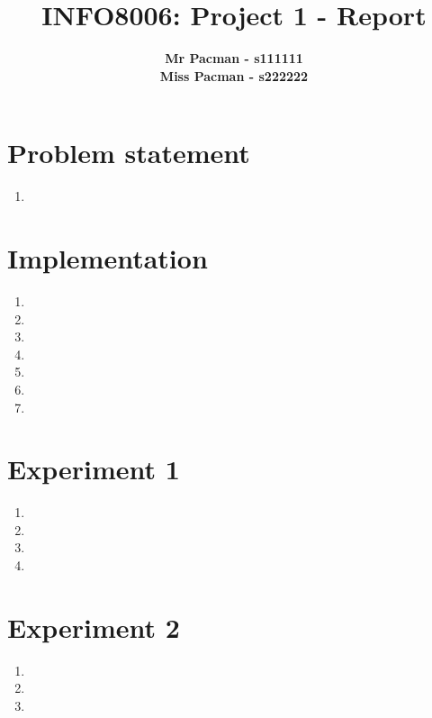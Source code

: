 \documentclass{article}
\begin{document}

\title{\Large{INFO8006: Project 1 - Report}}
\vspace{1cm}
\author{\small{\bf Mr Pacman - s111111} \\ \small{\bf Miss Pacman - s222222}}

\maketitle


\section{Problem statement}

\begin{enumerate}[label=\alph*.]
    \item 
\end{enumerate}

\section{Implementation}

\begin{enumerate}[label=\alph*.]
	\item
    \item 
    \item
    \item
    \item
    \item
    \item
\end{enumerate}

\section{Experiment 1}

\begin{enumerate}[label=\alph*.]
    \item 
    \item
    \item
    \item
\end{enumerate}

\section{Experiment 2}

\begin{enumerate}[label=\alph*.]
    \item 
    \item
    \item
\end{enumerate}





\end{document}
